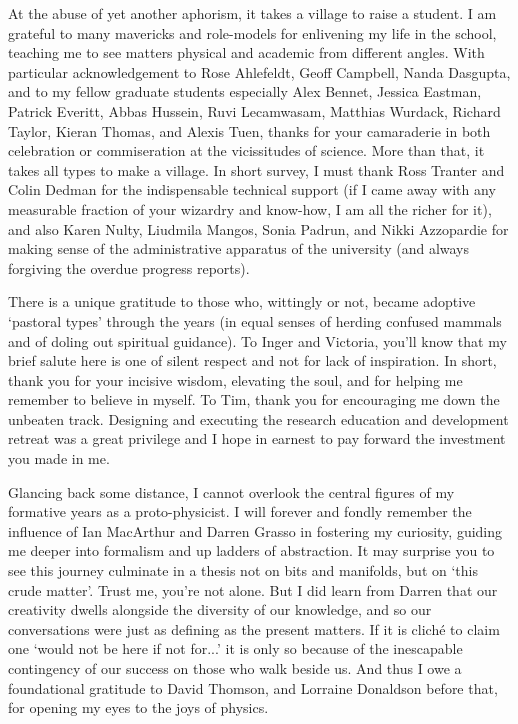 At the abuse of yet another aphorism, it takes a village to raise a student. I am grateful to many mavericks and role-models for enlivening my life in the school, teaching me to see matters physical and academic from different angles. With particular acknowledgement to Rose Ahlefeldt, Geoff Campbell, Nanda Dasgupta, and to my fellow graduate students especially Alex Bennet, Jessica Eastman, Patrick Everitt, Abbas Hussein, Ruvi Lecamwasam, Matthias Wurdack, Richard Taylor, Kieran Thomas, and Alexis Tuen, thanks for your camaraderie in both celebration or commiseration at the vicissitudes of science.
More than that, it takes all types to make a village. In short survey, I must thank Ross Tranter and Colin Dedman for the indispensable technical support (if I came away with any measurable fraction of your wizardry and know-how, I am all the richer for it), and also Karen Nulty, Liudmila Mangos, Sonia Padrun, and Nikki Azzopardie for making sense of the administrative apparatus of the university (and always forgiving the overdue progress reports).

There is a unique gratitude to those who, wittingly or not, became adoptive `pastoral types' through the years (in equal senses of herding confused mammals and of doling out spiritual guidance). To Inger and Victoria, you'll know that my brief salute here is one of silent respect and not for lack of inspiration. In short, thank you for your incisive wisdom, elevating the soul, and for helping me remember to believe in myself. To Tim, thank you for encouraging me down the unbeaten track. Designing and executing the research education and development retreat was a great privilege and I hope in earnest to pay forward the investment you made in me. 

Glancing back some distance, I cannot overlook the central figures of my formative years as a proto-physicist. 
I will forever and fondly remember the influence of Ian MacArthur and Darren Grasso in fostering my curiosity, guiding me deeper into formalism and up ladders of abstraction.
It may surprise you to see this journey culminate in a thesis not on bits and manifolds, but on `this crude matter'. Trust me, you're not alone.
But I did learn from Darren that our creativity dwells alongside the diversity of our knowledge, and so our conversations were just as defining as the present matters.
If it is clich\'{e} to claim one `would not be here if not for...' it is only so because of the inescapable contingency of our success on those who walk beside us.
And thus I owe a foundational gratitude to David Thomson, and Lorraine Donaldson before that, for opening my eyes to the joys of physics.

